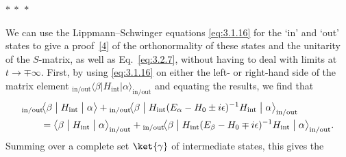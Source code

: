 \begin{center}
$*\ *\ *$
\end{center}

We can use the Lippmann--Schwinger equations \eqref{eq:3.1.16} for the `in' and `out'
states to give a proof~\hyperref[ref:3.4]{[4]} of the orthonormality of these states and the
unitarity of the $S$-matrix, as well as Eq.~\eqref{eq:3.2.7}, without having to deal
with limits at $t\to\mp\infty$. First, by using \eqref{eq:3.1.16} on either the left-
or right-hand side of the matrix element
${}_{\mathrm{in/out}}\!\langle\beta|H_{\mathrm{int}}|
\alpha\rangle_{\mathrm{in/out}}$ and equating the results, we find that
\begin{align*}
&{}_{\mathrm{in/out}}\!\bigl\langle\beta\bigm|H_{\mathrm{int}}
\bigm|\alpha\bigr\rangle
+{}_{\mathrm{in/out}}\!\bigl\langle\beta\bigm|
H_{\mathrm{int}}(E_\alpha-H_0\mathbin{\pm}i\epsilon)^{-1}
H_{\mathrm{int}}\bigm|\alpha\bigr\rangle_{\mathrm{in/out}}
\\
&\qquad={}
\bigl\langle\beta\bigm|H_{\mathrm{int}}
\bigm|\alpha\bigr\rangle_{\mathrm{in/out}}
+{}_{\mathrm{in/out}}\!\bigl\langle\beta\bigm|
H_{\mathrm{int}}(E_\beta-H_0\mathbin{\mp}i\epsilon)^{-1}
H_{\mathrm{int}}\bigm|\alpha\bigr\rangle_{\mathrm{in/out}}.
\end{align*}
Summing over a complete set $\ket{\gamma}$ of intermediate states, this gives
the
